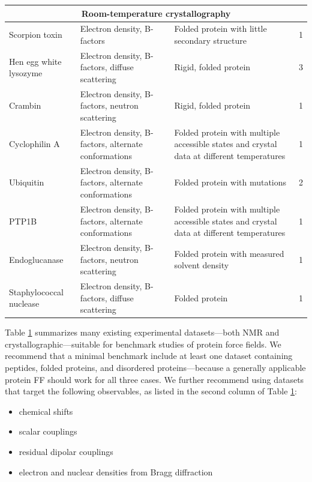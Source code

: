 \documentclass[9pt,review,pubversion]{livecoms}
\begin{document}
\begin{table}[!ht]
\begin{tabular}{p{} p{} p{} c}
\midrule
\multicolumn{4}{c}{\bf Room-temperature crystallography} \\
\midrule
Scorpion toxin \cite{smith_ab_1997} & Electron density, B-factors & Folded protein with little secondary structure & 1 \\
Hen egg white lysozyme \cite{ramanadham_refinement_1990,meisburger_diffuse_2020,walsh_refinement_1998,wang_triclinic_2007,artymiuk_structures_1982,meisburger_robust_2023} & Electron density, B-factors, diffuse scattering & Rigid, folded protein & 3 \\
Crambin \cite{teeter_water_1984,chen_room-temperature_2012,chen_solvent_2024} & Electron density, B-factors, neutron scattering & Rigid, folded protein & 1 \\
Cyclophilin A \cite{keedy_mapping_2015,van_benschoten_measuring_2016,thompson_temperature-jump_2019} & Electron density, B-factors, alternate conformations & Folded protein with multiple accessible states and crystal data at different temperatures & 1 \\
Ubiquitin \cite{biel_flexibility_2017} & Electron density, B-factors, alternate conformations & Folded protein with mutations & 2 \\
PTP1B \cite{keedy_expanded_2018} & Electron density, B-factors, alternate conformations & Folded protein with multiple accessible states and crystal data at different temperatures & 1 \\
Endoglucanase \cite{nakamura_newtons_2015} & Electron density, B-factors, neutron scattering & Folded protein with measured solvent density & 1 \\
Staphylococcal nuclease \cite{wall_three-dimensional_1997} & Electron density, B-factors, diffuse scattering & Folded protein & 1 \\
\bottomrule
\end{tabular}
\label{tab:datasets}
\end{table}

Table \ref{tab:datasets} summarizes many existing experimental datasets---both NMR and 
crystallographic---suitable for benchmark studies of protein force fields.
We recommend that a minimal benchmark include at least one dataset containing peptides, folded proteins, and disordered proteins---because a generally applicable protein FF should work for all three cases.
We further recommend using datasets that target the following observables, as listed in the second column of Table \ref{tab:datasets}:

\begin{itemize}
\item chemical shifts
\item scalar couplings
\item residual dipolar couplings
\item electron and nuclear densities from Bragg diffraction
\end{itemize}
\end{document}
